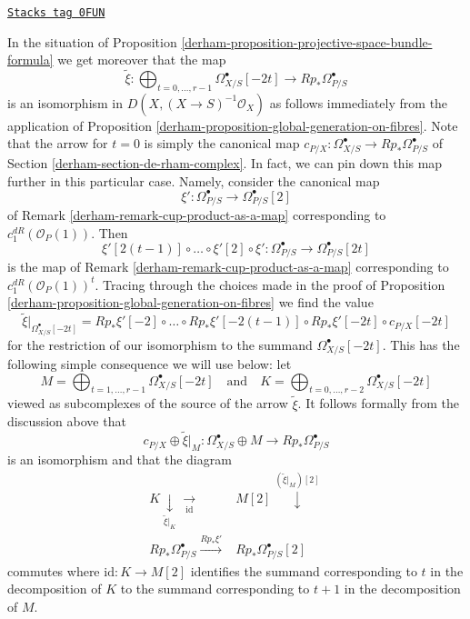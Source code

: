 \begin{remark}
\label{derham-remark-projective-space-bundle-formula}
\href{https://stacks.math.columbia.edu/tag/0FUN}{\texttt{Stacks tag 0FUN}}

In the situation of
Proposition \ref{derham-proposition-projective-space-bundle-formula}
we get moreover that the map
$$
\tilde \xi :
\bigoplus\nolimits_{t = 0, \ldots, r - 1}
\Omega^\bullet_{X/S}[-2t]
\longrightarrow
Rp_*\Omega^\bullet_{P/S}
$$
is an isomorphism in $D(X, (X \to S)^{-1}\mathcal{O}_X)$ as follows
immediately from the application of
Proposition \ref{derham-proposition-global-generation-on-fibres}.
Note that the arrow for $t = 0$ is simply the canonical map
$c_{P/X} : \Omega^\bullet_{X/S} \to Rp_*\Omega^\bullet_{P/S}$
of Section \ref{derham-section-de-rham-complex}.
In fact, we can pin down this map further in this particular case.
Namely, consider the canonical map
$$
\xi' : \Omega^\bullet_{P/S} \to \Omega^\bullet_{P/S}[2]
$$
of Remark \ref{derham-remark-cup-product-as-a-map} corresponding to
$c_1^{dR}(\mathcal{O}_P(1))$. Then
$$
\xi'[2(t - 1)] \circ \ldots \circ \xi'[2] \circ \xi' :
\Omega^\bullet_{P/S} \to \Omega^\bullet_{P/S}[2t]
$$
is the map of Remark \ref{derham-remark-cup-product-as-a-map} corresponding to
$c_1^{dR}(\mathcal{O}_P(1))^t$. Tracing through the choices made in the
proof of Proposition \ref{derham-proposition-global-generation-on-fibres}
we find the value
$$
\tilde \xi|_{\Omega^\bullet_{X/S}[-2t]} =
Rp_*\xi'[-2] \circ \ldots \circ Rp_*\xi'[-2(t - 1)] \circ
Rp_*\xi'[-2t] \circ c_{P/X}[-2t]
$$
for the restriction of our isomorphism to the summand
$\Omega^\bullet_{X/S}[-2t]$. This has the following simple
consequence we will use below: let
$$
M = \bigoplus\nolimits_{t = 1, \ldots, r - 1} \Omega^\bullet_{X/S}[-2t]
\quad\text{and}\quad
K = \bigoplus\nolimits_{t = 0, \ldots, r - 2} \Omega^\bullet_{X/S}[-2t]
$$
viewed as subcomplexes of the source of the arrow $\tilde \xi$.
It follows formally from the discussion above that
$$
c_{P/X} \oplus
\tilde \xi|_M :
\Omega^\bullet_{X/S} \oplus M \longrightarrow
Rp_*\Omega^\bullet_{P/S}
$$
is an isomorphism and that the diagram
$$
\begin{array}{cc}K \underset{\tilde \xi|_K}{\downarrow}\underset{\text{id}}{\longrightarrow} & M[2] \overset{(\tilde \xi|_M)[2]}{\downarrow} \\ Rp_*\Omega^\bullet_{P/S} \overset{Rp_*\xi'}{\longrightarrow} & Rp_*\Omega^\bullet_{P/S}[2]\end{array}
$$
commutes where $\text{id} : K \to M[2]$ identifies the summand
corresponding to $t$ in the decomposition of $K$ to the summand
corresponding to $t + 1$ in the decomposition of $M$.
\end{remark}


